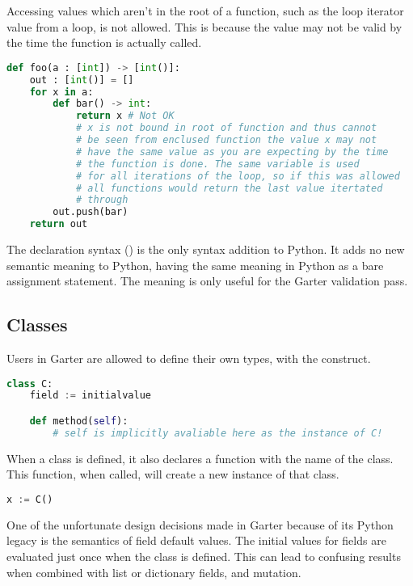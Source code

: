 Accessing values which aren't in the root of a function, such as the loop
iterator value from a  loop, is not allowed. This is because the value
may not be valid by the time the function is actually called.

\begin{lstlisting}[language=Python]
def foo(a : [int]) -> [int()]:
    out : [int()] = []
    for x in a:
        def bar() -> int:
            return x # Not OK
            # x is not bound in root of function and thus cannot
            # be seen from enclused function the value x may not
            # have the same value as you are expecting by the time
            # the function is done. The same variable is used
            # for all iterations of the loop, so if this was allowed
            # all functions would return the last value itertated
            # through
        out.push(bar)
    return out
\end{lstlisting}

The declaration syntax () is the only syntax addition to Python.
It adds no new semantic meaning to Python, having the same meaning in Python
as a bare assignment statement. The meaning is only useful for the Garter
validation pass.

\subsection{Classes}

Users in Garter are allowed to define their own types, with the 
construct.

\begin{lstlisting}[language=Python]
class C:
    field := initialvalue

    def method(self):
        # self is implicitly avaliable here as the instance of C!
\end{lstlisting}

When a class is defined, it also declares a function with the name of the class.
This function, when called, will create a new instance of that class.

\begin{lstlisting}[language=Python]
x := C()
\end{lstlisting}

One of the unfortunate design decisions made in Garter because of its Python
legacy is the semantics of field default values. The initial values for fields
are evaluated just once when the class is defined. This can lead to confusing
results when combined with list or dictionary fields, and mutation.

